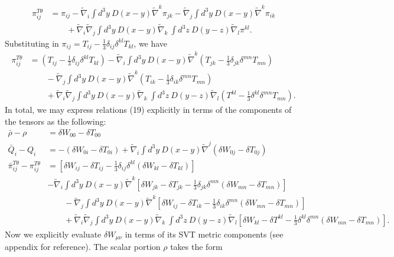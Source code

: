\documentclass[10pt,letterpaper]{article}
\begin{document}
\begin{align}
\pi_{ij}^{T\theta} &= \pi_{ij} - \tilde\nabla_i \int d^3y\ D(x-y) \tilde\nabla^k \pi_{jk} - \tilde\nabla_j \int d^3y\ D(x-y) \tilde\nabla^k \pi_{ik}
\nonumber\\
&\qquad
+\tilde\nabla_i\tilde\nabla_j \int d^3y\ D(x-y) \tilde\nabla_k\ \int d^3z\ D(y-z) \tilde\nabla_l \pi^{kl}.
\end{align}
Substituting in $\pi_{ij} = T_{ij} -\frac13 \delta_{ij} \delta^{kl}T_{kl}$, we have
\begin{align}
\pi_{ij}^{T\theta} &=\left(T_{ij} -\frac13 \delta_{ij} \delta^{kl}T_{kl}\right) - \tilde\nabla_i \int d^3y\ D(x-y) \tilde\nabla^k \left(T_{jk} -\frac13 \delta_{jk} \delta^{mn}T_{mn}\right)
\nonumber\\
&\qquad
 - \tilde\nabla_j \int d^3y\ D(x-y) \tilde\nabla^k \left(T_{ik} -\frac13 \delta_{ik} \delta^{mn}T_{mn}\right)
\nonumber\\
&\qquad
+\tilde\nabla_i\tilde\nabla_j \int d^3y\ D(x-y) \tilde\nabla_k\ \int d^3z\ D(y-z) \tilde\nabla_l \left(T^{kl} -\frac13 \delta^{kl} \delta^{mn}T_{mn}\right).
\end{align}
In total, we may express relations (19) explicitly in terms of the components of the tensors as the following:
\begin{align}
 \bar \rho - \rho &= \delta W_{00} - \delta T_{00}\\
 \bar Q_i - Q_i & = -(\delta W_{0i}-\delta T_{0i}) + \tilde\nabla_i \int d^3y\ D(x-y)\tilde\nabla^j( \delta W_{0j}-\delta T_{0j})
\\
\bar \pi^{T\theta}_{ij} - \pi_{ij}^{T\theta}&= \left[\delta W_{ij} -\delta T_{ij} -\frac13 \delta_{ij} \delta^{kl}\left(\delta W_{kl}-\delta T_{kl}\right)\right] 
\nonumber\\
&- \tilde\nabla_i \int d^3y\ D(x-y) \tilde\nabla^k \left[\delta W_{jk}-\delta T_{jk} 
-\frac13 \delta_{jk} \delta^{mn}\left(\delta W_{mn}-\delta T_{mn}\right)\right]
\nonumber\\
&\qquad
 - \tilde\nabla_j \int d^3y\ D(x-y) \tilde\nabla^k \left[\delta W_{ij} -\delta T_{ik} -\frac13 \delta_{ik} \delta^{mn}\left(\delta W_{mn} -\delta T_{mn}\right)\right]
\nonumber\\
&\qquad
+\tilde\nabla_i\tilde\nabla_j \int d^3y\ D(x-y) \tilde\nabla_k\ \int d^3z\ D(y-z) \tilde\nabla_l \left[\delta W_{kl}-\delta T^{kl} -\frac13 \delta^{kl} \delta^{mn}\left(\delta W_{mn}-\delta T_{mn}\right)\right].
\end{align}
Now we explicitly evaluate $\delta W_{\mu\nu}$ in terms of its SVT metric components (see appendix for reference). The scalar portion $\rho$ takes the form
\end{document}
